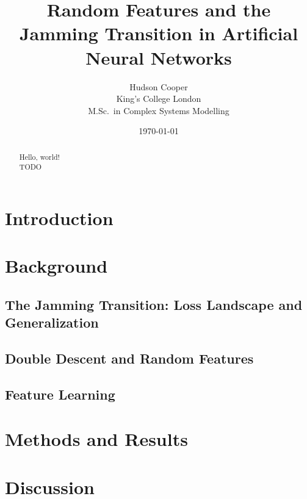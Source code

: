 \documentclass[a4paper, 12pt, titlepage]{article}
\begin{document}
\title{\bf Random Features and the Jamming Transition in Artificial Neural Networks}
\author{
    Hudson Cooper\\
    King's College London\\
    M.Sc.\ in Complex Systems Modelling
}
\date{\today}
\maketitle

\begin{abstract}
    Hello, world!\\
    TODO
\end{abstract}

\section{Introduction}
\lipsum[1]\cite{baity-jesiComparingDynamicsDeep2019}
\section{Background}

\subsection{The Jamming Transition: Loss Landscape and Generalization}
\subsection{Double Descent and Random Features}
\subsection{Feature Learning}

\section{Methods and Results}

\section{Discussion}

\printbibliography
\end{document}
